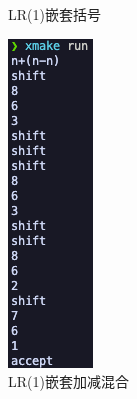 \begin{figure}[htbp]
\begin{minipage}[t]{0.2\textwidth}
        \caption{LR(1)嵌套括号}
        \label{fig:lr-5}
    \end{minipage}
    \begin{minipage}[t]{0.2\textwidth}
        \centering
        \includegraphics[width=\textwidth]{images/lr_6.png}
        \caption{LR(1)嵌套加减混合}
        \label{fig:lr-6}
    \end{minipage}
\end{figure}

